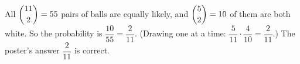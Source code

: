 All $\dbinom{11}{2}=55$ pairs of balls are equally likely, and $\dbinom{5}{2}=10$ of them are both white. So the probability is $\dfrac{10}{55}=\boxed{\dfrac{2}{11}}$. (Drawing one at a time: $\dfrac{5}{11}\cdot\dfrac{4}{10}=\dfrac{2}{11}$.) The poster's answer $\dfrac{2}{11}$ is correct.
